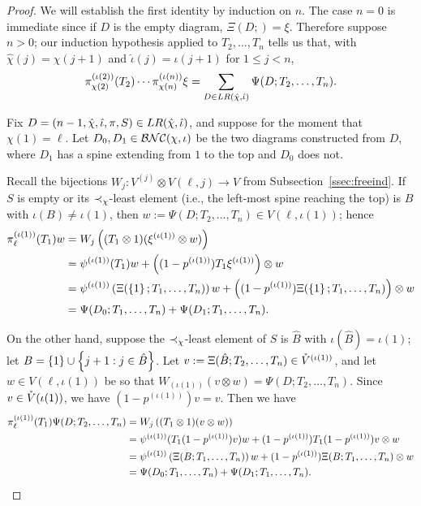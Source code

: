\begin{proof}
	We will establish the first identity by induction on $n$.
	The case $n = 0$ is immediate since if $D$ is the empty diagram, $\Xi(D;) = \xi$.
	Therefore suppose $n > 0$; our induction hypothesis applied to $T_2, \ldots, T_n$ tells us that, with $\hat\chi(j) = \chi(j+1)$ and $\hat\iota(j) = \iota(j+1)$ for $1 \leq j < n$,
	$$
	\pi_{\chi(2)}^{(\iota(2))}(T_2)\cdots \pi_{\chi(n)}^{(\iota(n))}\xi
	= \sum_{D \in LR(\hat\chi, \hat\iota)} \Psi(D; T_2, \ldots, T_n).
	$$

	Fix $D = (n-1, \hat\chi, \hat\iota, \pi, S) \in LR(\hat\chi, \hat\iota)$, and suppose for the moment that $\chi(1) = \ell$.
	Let $D_0, D_1 \in \mathcal{BNC}(\chi, \iota)$ be the two diagrams constructed from $D$, where $D_1$ has a spine extending from $1$ to the top and $D_0$ does not.

	Recall the bijections $W_j : V^{(j)}\otimes V(\ell, j) \to V$ from Subsection~\ref{ssec:freeind}.
	If $S$ is empty or its $\prec_\chi$-least element (i.e., the left-most spine reaching the top) is $B$ with $\iota(B) \neq \iota(1)$, then $w := \Psi(D; T_2, \ldots, T_n) \in V(\ell, \iota(1))$; hence
	\begin{align*}
		\pi_\ell^{(\iota(1))}(T_1)w
		&= W_j\left((T_1\otimes 1)(\xi^{(\iota(1))}\otimes w) \right)\\
		& = \psi^{(\iota(1))}(T_1) w + \left((1-p^{(\iota(1))}) T_1\xi^{(\iota(1))}\right) \otimes w \\
		& = \psi^{(\iota(1))}\left(\Xi(\left\{1\right\}; T_1, \ldots, T_n)\right) w + \left((1-p^{(\iota(1))})\Xi(\left\{1\right\}; T_1, \ldots, T_n)\right)\otimes w \\
		& = \Psi(D_0; T_1, \ldots, T_n) + \Psi(D_1; T_1, \ldots, T_n).
	\end{align*}

	On the other hand, suppose the $\prec_\chi$-least element of $S$ is $\hat B$ with $\iota(\hat B) = \iota(1)$; let $B = \left\{1\right\}\cup\left\{j+1 : j \in \hat B\right\}$.
	Let $v := \Xi(\hat B; T_2, \ldots, T_n) \in \mathring{V}^{(\iota(1))}$, and let $w \in V(\ell, \iota(1))$ be so that $W_{(\iota(1))}(v\otimes w) = \Psi(D; T_2, \ldots, T_n)$.
	Since $v \in \mathring{V}{(\iota(1))}$, we have $(1-p^{(\iota(1))})v = v$.
	Then we have
	\begin{align*}
		\pi_\ell^{(\iota(1))}(T_1)\Psi(D; T_2, \ldots, T_n)
		&= W_j\left((T_1\otimes 1)(v \otimes w)\right) \\
		& = \psi^{(\iota(1))} (T_1(1-p^{(\iota(1))})v)w + (1-p^{(\iota(1))})T_1(1-p^{(\iota(1))})v \otimes w \\
		& = \psi^{(\iota(1))} \left(\Xi(B; T_1, \ldots, T_n)\right)w + (1-p^{(\iota(1))})\Xi(B; T_1, \ldots, T_n)\otimes w \\
		& = \Psi(D_0; T_1, \ldots, T_n) + \Psi(D_1; T_1, \ldots, T_n).
	\end{align*}


\end{proof}
